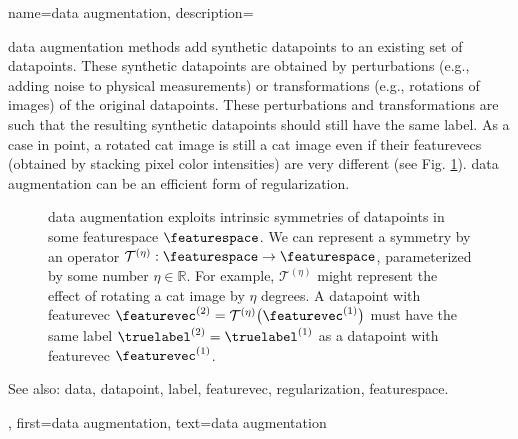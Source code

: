 {name={data augmentation},
	description={\Gls{data} augmentation methods add synthetic \glspl{datapoint} 
		to an existing set of \glspl{datapoint}. These synthetic \glspl{datapoint} are obtained by 
		perturbations (e.g., adding noise to physical measurements) or transformations 
		(e.g., rotations of images) of the original \glspl{datapoint}. These perturbations and 
		transformations are such that the resulting synthetic \glspl{datapoint} should 
		still have the same \gls{label}. As a case in point, a rotated cat image is still 
		a cat image even if their \glspl{featurevec} (obtained by stacking pixel color intensities) 
		are very different (see Fig. \ref{fig_symmetry_dataaug_dict}). \Gls{data} augmentation can be an 
		efficient form of \gls{regularization}.
		\begin{figure}[H]
		\begin{center}
			  \vspace*{-11mm}
		\end{center}
		\caption{\Gls{data} augmentation exploits intrinsic symmetries of \glspl{datapoint} in 
		    some \gls{featurespace} $\featurespace$. We can represent a symmetry by 
		    an operator $\mathcal{T}^{(\eta)}: \featurespace \rightarrow \featurespace$,
		    parameterized by some number $\eta \in \mathbb{R}$. For example, $\mathcal{T}^{(\eta)}$ 
		    might represent the effect of rotating a cat image by $\eta$ degrees. A \gls{datapoint} 
		    with \gls{featurevec} $\featurevec^{(2)} = \mathcal{T}^{(\eta)} \big(\featurevec^{(1)} \big)$ must 
		    have the same \gls{label} $\truelabel^{(2)}=\truelabel^{(1)}$ as a \gls{datapoint} 
		    with \gls{featurevec} $\featurevec^{(1)}$.\label{fig_symmetry_dataaug_dict}}
		 \end{figure}
		See also: \gls{data}, \gls{datapoint}, \gls{label}, \gls{featurevec}, \gls{regularization}, \gls{featurespace}. },
	first={data augmentation},
	text={data augmentation}
}
	
